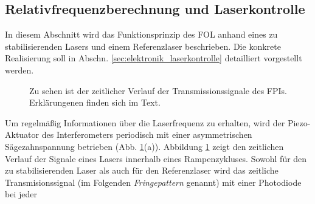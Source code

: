 \subsection{Relativfrequenzberechnung
und Laserkontrolle}\label{subsec:relativfrequenzberechnung_und_laserkontrolle}
In diesem Abschnitt wird das Funktionsprinzip des FOL anhand
eines zu stabilisierenden Lasers und einem Referenzlaser beschrieben. Die
konkrete Realisierung soll in Abschn. \ref{sec:elektronik_laserkontrolle}
detailliert vorgestellt werden.\par
\begin{figure}[h]
 	\centering
	\caption[Zeitlicher Verlauf
	FPI-Transmission]{Zu sehen ist der zeitlicher Verlauf der
	Transmissionssignale des FPIs. Erklärungenen finden sich im
	Text.}\label{fig:FPI_signal-zeitverlauf}
\end{figure}
Um regelmäßig Informationen über die Laserfrequenz zu erhalten, wird der
Piezo-Aktuator des Interferometers periodisch mit einer asymmetrischen
Sägezahnspannung betrieben (Abb. \ref{fig:FPI_signal-zeitverlauf}(a)). Abbildung
\ref{fig:FPI_signal-zeitverlauf} zeigt den zeitlichen Verlauf der Signale eines
Lasers innerhalb eines Rampenzykluses. Sowohl für den zu stabilisierenden
Laser als auch für den Referenzlaser wird das zeitliche Transmisionssignal (im
Folgenden \textit{Fringepattern} genannt) mit einer Photodiode bei jeder
